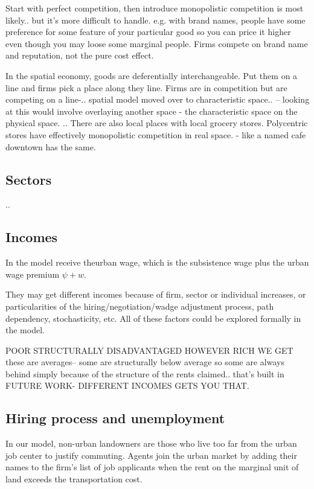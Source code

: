 Start with perfect competition, then introduce monopolistic competition is most likely.. but it's more difficult to handle. e.g. with brand names, people have some preference for some feature of your particular good so you can price it higher even though you may loose some marginal people. Firms compete on brand name and reputation, not the pure cost effect.

In the spatial economy, goods are deferentially interchangeable. Put them on a line and firms pick a place along they line. Firms are in competition but are competing on a line-.. spatial model moved over to characteristic space.. -- looking at this would involve overlaying another space - the characteristic space on the physical space. .. There are also local places with local grocery stores. Polycentric stores have effectively monopolistic competition in real space. - like a named cafe downtown has the same.

\subsection{Sectors}
..


\subsection{Incomes}
In the model receive the\gls{urban wage}, which is the subsistence wage plus the urban wage premium $\psi + w$.

They may get different incomes because of firm, sector or individual increases, or particularities of the 
hiring/negotiation/wadge adjustment process, path dependency, stochasticity, etc. 
All of these factors could be explored formally in the model. %


POOR STRUCTURALLY DISADVANTAGED HOWEVER RICH WE GET
these are averages-- some are structurally below average so some are always behind simply because of the structure of the rents claimed.. that's built in FUTURE WORK- DIFFERENT INCOMES GETS YOU THAT. 



\subsection{Hiring process and unemployment} \label{rockefeller}
 In our model, non-urban landowners are those who live too far from the urban job center to justify commuting.  Agents join the urban market by adding their names to the firm's list of job applicants when the rent on the marginal unit of land exceeds the transportation cost. 

